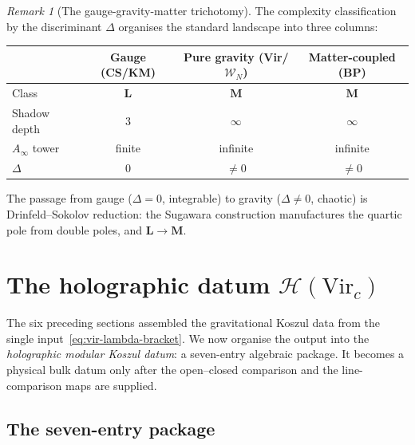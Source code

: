 \documentclass[11pt,reqno]{amsart}
\theoremstyle{definition}
\theoremstyle{remark}
\newtheorem{remark}[theorem]{Remark}
\begin{document}
\begin{remark}[The gauge-gravity-matter trichotomy]
\label{rem:trichotomy}
The complexity classification by the discriminant $\Delta$
organises the standard landscape into three columns:
\begin{center}
\small
\renewcommand{\arraystretch}{1.2}
\begin{tabular}{@{}l|ccc@{}}
& \textbf{Gauge (CS/KM)} & \textbf{Pure gravity (Vir/$\mathcal{W}_N$)}
& \textbf{Matter-coupled (BP)} \\
\hline
Class & $\mathbf{L}$ & $\mathbf{M}$ & $\mathbf{M}$ \\
Shadow depth & $3$ & $\infty$ & $\infty$ \\
$A_\infty$ tower & finite & infinite & infinite \\
$\Delta$ & $0$ & $\ne 0$ & $\ne 0$ \\
\end{tabular}
\end{center}
The passage from gauge ($\Delta = 0$, integrable) to gravity
($\Delta \ne 0$, chaotic) is Drinfeld--Sokolov reduction: the
Sugawara construction manufactures the quartic pole from double
poles, and $\mathbf{L} \to \mathbf{M}$.
\end{remark}

\section{The holographic datum $\mathcal{H}(\mathrm{Vir}_c)$}
\label{sec:holographic-datum}

The six preceding sections assembled the gravitational Koszul
data from the single input~\eqref{eq:vir-lambda-bracket}.
We now organise the output into the \emph{holographic modular
Koszul datum}: a seven-entry algebraic package.  It becomes a
physical bulk datum only after the open--closed comparison and the
line-comparison maps are supplied.

\subsection{The seven-entry package}
\end{document}
